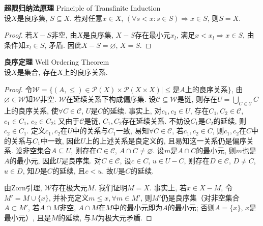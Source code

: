 \begin{thm}\textbf{超限归纳法原理} Principle of Transfinite Induction\\
设$X$是良序集, $S\subseteq X$. 若对任意$x\in X$, $(\forall s<x: s\in S) \Rightarrow x\in S$, 则$S=X$. 
\label{thm:transinduct}
\end{thm}
\begin{proof}
若$X-S$非空, 由$X$是良序集, $X-S$存在最小元$x_l$, 满足$x<x_l \Rightarrow x\in S$, 由条件知$x_l \in S$, 矛盾. 因此$X-S=\varnothing$, $X=S$.
\end{proof}

\begin{thm} \textbf{良序定理} Well Ordering Theorem\\
设$X$是集合, 存在$X$上的良序关系. 
\end{thm}
\begin{proof}
令$\mathcal{W}=\{(A,\le)\in \mathcal{P}(X)\times \mathcal{P}(X\times X)\vert \le\text{是}A\text{上的良序关系}\}$, 由$\varnothing\in \mathcal{W}$知$\mathcal{W}$非空. $\mathcal{W}$在延续关系下构成偏序集. 设$\mathcal{C}\subseteq \mathcal{W}$是链, 则存在$U=\bigcup_{C\in \mathcal{C}} C$上的良序关系, 使$\forall C\in \mathcal{C}$, $U$是$C$的延续. 事实上, 对$c_1,c_2\in U$, 存在$C_1,C_2\in \mathcal{C}$, $c_1\in C_1$, $c_2\in C_2$; 又由于$\mathcal{C}$是链, $C_1,C_2$存在延续关系. 不妨设$C_1$是$C_2$的延续, 则$c_2\in C_1$. 定义$c_1,c_2$在$U$中的关系与$C_1$一致, 易知$\forall C\in \mathcal{C}$, 若$c_1,c_2\in C$, 则$c_1,c_2$在$C$中的关系与$C_1$中一致, 因此$U$上的上述关系是良定义的, 且易知这一关系仍是偏序关系. 设非空集合$A\subseteq U$, 则存在$C\in \mathcal{C}$, $A\cap C\neq \varnothing$. 设$m$是$A\cap C$的最小元, 则$m$也是$A$的最小元, 因此$U$是良序集. 对$C\in \mathcal{C}$, 设$c\in C$, $u\in U-C$, 则存在$D\in \mathcal{C}$, $D\neq C$, $u\in D$, 知$D$是$C$的延续, 且$c<u$. 故$U$是$C$的延续.
\par 由Zorn引理, $\mathcal{W}$存在极大元$M$. 我们证明$M=X$. 事实上, 若$x\in X-M$, 令$M'=M\cup \{x\}$, 并补充定义$m\le x, \forall m\in M'$, 则$M'$仍是良序集（对非空集合$A\subset M'$, 若$A\cap M$非空, $A\cap M$在$M$中的最小元即为$A$的最小元; 否则$A=\{x\}$, $x$是最小元）, 且是$M$的延续, 与$M$为极大元矛盾. 
\end{proof}

